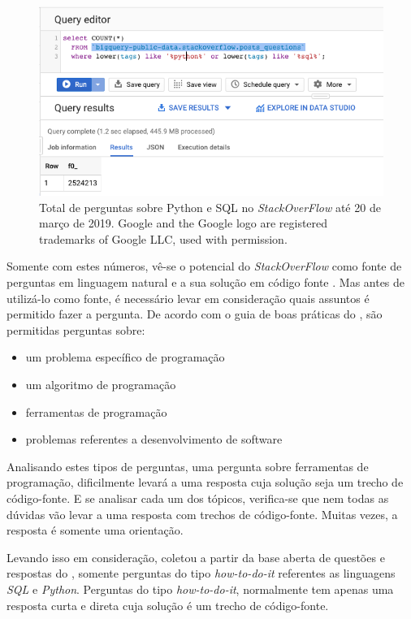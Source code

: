 \begin{figure}[h]
\includegraphics[width=12cm]{figuras/cap-problema/post-questions-python-sql-total.png}
\caption{Total de perguntas sobre Python e SQL no \textit{StackOverFlow} até 20 de março de 2019. Google and the Google logo are registered trademarks of Google LLC, used with permission.}
\label{fig:bigquery-total-questions-python-sql-stackoverflow}
\end{figure}

Somente com estes números, vê-se o potencial do \textit{StackOverFlow} como fonte de perguntas em linguagem natural e a sua solução em código fonte \cite{yao-2018}. Mas antes de utilizá-lo como fonte, é necessário levar em consideração quais assuntos é permitido fazer a pergunta. De acordo com o guia de boas práticas do \cite{stackoverflow-questions-topics-2019}, são permitidas perguntas sobre:

\begin{itemize}
    \item um problema específico de programação
    \item um algoritmo de programação
    \item ferramentas de programação
    \item problemas referentes a desenvolvimento de software
\end{itemize}

Analisando estes tipos de perguntas, uma pergunta sobre ferramentas de programação, dificilmente levará a uma resposta cuja solução seja um trecho de código-fonte. E se analisar cada um dos tópicos, verifica-se que nem todas as dúvidas vão levar a uma resposta com trechos de código-fonte. Muitas vezes, a resposta é somente uma orientação.

Levando isso em consideração, \citeauthor{yao-2018} coletou a partir da base aberta de questões e respostas do \cite{stackoverflow-questions-topics-2019}, somente perguntas do tipo \textit{how-to-do-it} referentes as linguagens \textit{SQL} e \textit{Python}. Perguntas do tipo \textit{how-to-do-it}, normalmente tem apenas uma resposta curta e direta cuja solução é um trecho de código-fonte. 


